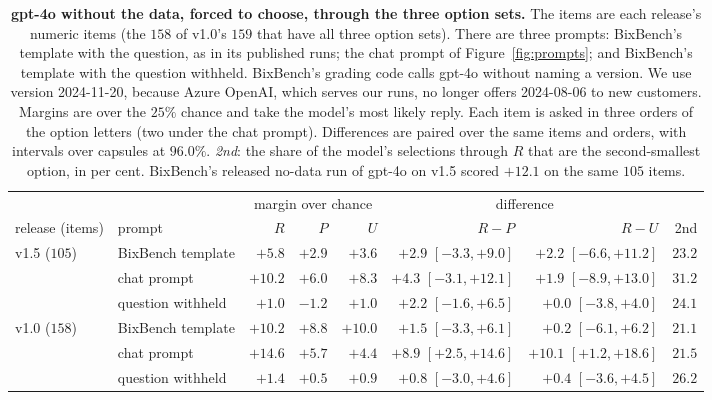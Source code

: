 \documentclass{article}
\begin{document}
\begin{table}[htbp]
\centering\footnotesize\setlength{\tabcolsep}{3pt}
\caption{\textbf{gpt-4o without the data, forced to choose, through the three option sets.} The items are each
release's numeric items (the $158$ of v1.0's $159$ that have all three option sets). There are three prompts:
BixBench's template with the question, as in its published runs; the chat prompt of Figure~\ref{fig:prompts}; and
BixBench's template with the question withheld. BixBench's grading code calls gpt-4o without naming a version. We use version 2024-11-20,
because Azure OpenAI, which serves our runs, no longer offers 2024-08-06 to new customers. Margins are
over the $25\%$ chance and take the model's most likely reply. Each item is asked in three orders of the option letters
(two under the chat prompt). Differences are paired over the same items and orders, with intervals over capsules at
$96.0\%$. \emph{2nd}: the share of the model's selections through $R$ that are the second-smallest option, in per cent.
BixBench's released no-data run of gpt-4o on v1.5 scored $+12.1$ on the same $105$ items.}
\label{tab:gptnodata}
\begin{tabular}{llrrrrrr}
\toprule
& & \multicolumn{3}{c}{margin over chance} & \multicolumn{2}{c}{difference} &\\
\cmidrule(lr){3-5}\cmidrule(lr){6-7}
release (items) & prompt & $R$ & $P$ & $U$ & $R-P$ & $R-U$ & 2nd\\
\midrule
v1.5 ($105$) & BixBench template & $+5.8$ & $+2.9$ & $+3.6$ & $+2.9$ $[-3.3,+9.0]$ & $+2.2$ $[-6.6,+11.2]$ & $23.2$\\
 & chat prompt & $+10.2$ & $+6.0$ & $+8.3$ & $+4.3$ $[-3.1,+12.1]$ & $+1.9$ $[-8.9,+13.0]$ & $31.2$\\
 & question withheld & $+1.0$ & $-1.2$ & $+1.0$ & $+2.2$ $[-1.6,+6.5]$ & $+0.0$ $[-3.8,+4.0]$ & $24.1$\\
v1.0 ($158$) & BixBench template & $+10.2$ & $+8.8$ & $+10.0$ & $+1.5$ $[-3.3,+6.1]$ & $+0.2$ $[-6.1,+6.2]$ & $21.1$\\
 & chat prompt & $+14.6$ & $+5.7$ & $+4.4$ & $+8.9$ $[+2.5,+14.6]$ & $+10.1$ $[+1.2,+18.6]$ & $21.5$\\
 & question withheld & $+1.4$ & $+0.5$ & $+0.9$ & $+0.8$ $[-3.0,+4.6]$ & $+0.4$ $[-3.6,+4.5]$ & $26.2$\\
\bottomrule
\end{tabular}
\end{table}
\end{document}
